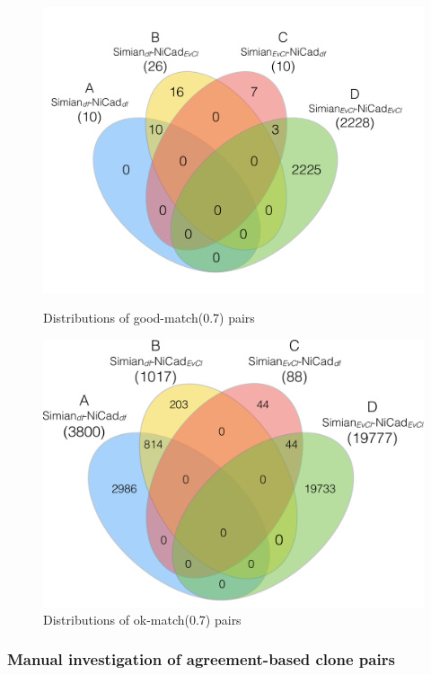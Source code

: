\documentclass{sig-alternate-05-2015}
\begin{document}
\begin{figure}
	\begin{minipage}{.5\textwidth}
		\centering
		\includegraphics[width=0.8\linewidth]{venn4_pairs_good_pt1+2}
		\caption{Distributions of good-match(0.7) pairs}
		\label{fig:venn4_orig_good}
	\end{minipage}
	\begin{minipage}{.5\textwidth}
		\centering
		\includegraphics[width=0.8\linewidth]{venn4_pairs_ok_pt1+2}
		\caption{Distributions of ok-match(0.7) pairs}
		\label{fig:venn4_orig_ok}
	\end{minipage}
\end{figure}

\subsubsection{Manual investigation of agreement-based clone pairs}
\end{document}
